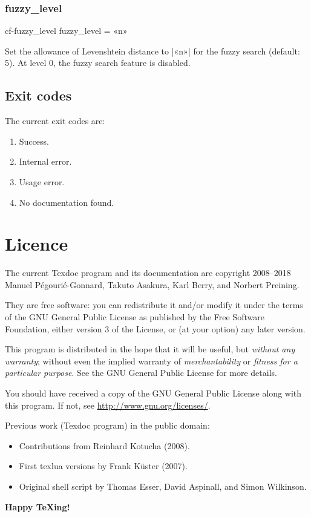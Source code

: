 \documentclass[a4paper,oneside]{scrartcl}
\newif\ifframed
\newenvironment{cmdsubsub}[2]
  {\framedfalse \commandes\subsubsection{#1}{#2}}
  {\endcommandes}
\begin{document}
\begin{cmdsubsub}{fuzzy_level}{cf-fuzzy_level}
  fuzzy_level = «n»
\end{cmdsubsub}

Set the allowance of Levenshtein distance to |«n»| for the fuzzy search
(default: 5). At level 0, the fuzzy search feature is disabled.

\subsection{Exit codes}\label{ss-exit}

The current exit codes are:
\begin{enumerate}[start=0]
  \item Success.
  \item Internal error.
  \item Usage error.
  \item No documentation found.
\end{enumerate}

\section{Licence}\label{s-licence}

The current Texdoc program and its documentation are copyright 2008--2018
Manuel Pégourié-Gonnard, Takuto Asakura, Karl Berry, and Norbert Preining.

They are free software: you can redistribute it and/or modify it under the
terms of the GNU General Public License as published by the Free Software
Foundation, either version 3 of the License, or (at your option) any later
version.

This program is distributed in the hope that it will be useful, but
\emph{without any warranty}; without even the implied warranty of
\emph{merchantability} or \emph{fitness for a particular purpose}. See the
GNU General Public License for more details.

You should have received a copy of the GNU General Public License along with
this program. If not, see \url{http://www.gnu.org/licenses/}.

\bigskip

Previous work (Texdoc program) in the public domain:
\begin{itemize}
  \item Contributions from Reinhard Kotucha (2008).
  \item First texlua versions by Frank Küster (2007).
  \item Original shell script by Thomas Esser, David Aspinall, and Simon
	Wilkinson.
\end{itemize}

\bigskip
\begin{center}\Large\bfseries
  Happy {\TeX}ing!
\end{center}
\end{document}
